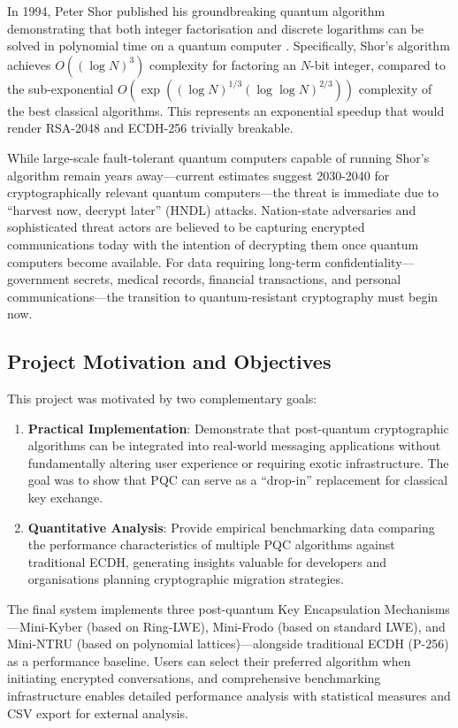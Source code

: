 \documentclass[11pt,a4paper]{article}
\begin{document}
In 1994, Peter Shor published his groundbreaking quantum algorithm demonstrating that both integer factorisation and discrete logarithms can be solved in polynomial time on a quantum computer \cite{shor1994}. Specifically, Shor's algorithm achieves $O((\log N)^3)$ complexity for factoring an $N$-bit integer, compared to the sub-exponential $O(\exp((\log N)^{1/3}(\log \log N)^{2/3}))$ complexity of the best classical algorithms. This represents an exponential speedup that would render RSA-2048 and ECDH-256 trivially breakable.

While large-scale fault-tolerant quantum computers capable of running Shor's algorithm remain years away---current estimates suggest 2030-2040 for cryptographically relevant quantum computers---the threat is immediate due to ``harvest now, decrypt later'' (HNDL) attacks. Nation-state adversaries and sophisticated threat actors are believed to be capturing encrypted communications today with the intention of decrypting them once quantum computers become available. For data requiring long-term confidentiality---government secrets, medical records, financial transactions, and personal communications---the transition to quantum-resistant cryptography must begin now.

\subsection{Project Motivation and Objectives}

This project was motivated by two complementary goals:

\begin{enumerate}
    \item \textbf{Practical Implementation}: Demonstrate that post-quantum cryptographic algorithms can be integrated into real-world messaging applications without fundamentally altering user experience or requiring exotic infrastructure. The goal was to show that PQC can serve as a ``drop-in'' replacement for classical key exchange.
    
    \item \textbf{Quantitative Analysis}: Provide empirical benchmarking data comparing the performance characteristics of multiple PQC algorithms against traditional ECDH, generating insights valuable for developers and organisations planning cryptographic migration strategies.
\end{enumerate}

The final system implements three post-quantum Key Encapsulation Mechanisms---Mini-Kyber (based on Ring-LWE), Mini-Frodo (based on standard LWE), and Mini-NTRU (based on polynomial lattices)---alongside traditional ECDH (P-256) as a performance baseline. Users can select their preferred algorithm when initiating encrypted conversations, and comprehensive benchmarking infrastructure enables detailed performance analysis with statistical measures and CSV export for external analysis.
\end{document}
